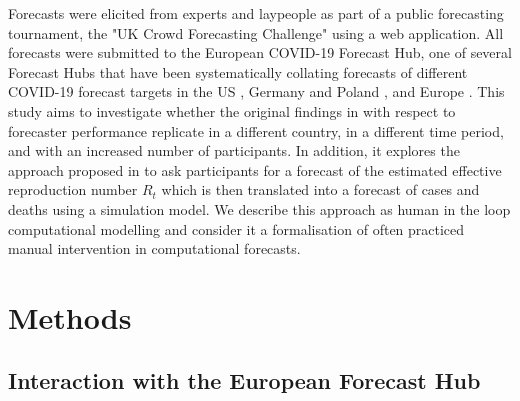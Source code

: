 \documentclass[10pt,a4paper,twocolumn]{article}
\begin{document}
Forecasts were elicited from experts and laypeople as part of a public forecasting tournament, the "UK Crowd Forecasting Challenge" using a web application. All forecasts were submitted to the European COVID-19 Forecast Hub, one of several Forecast Hubs that have been systematically collating forecasts of different COVID-19 forecast targets in the US \citep{cramerEvaluationIndividualEnsemble2021}, Germany and Poland \citep{bracherShorttermForecastingCOVID192021, bracherNationalSubnationalShortterm2022}, and Europe \citep{sherrattPredictivePerformanceMultimodel2022}. This study aims to investigate whether the original findings in \citet{bosseComparingHumanModelbased2022} with respect to forecaster performance replicate in a different country, in a different time period, and with an increased number of participants. In addition, it explores the approach proposed in \citet{bosseComparingHumanModelbased2022} to ask participants for a forecast of the estimated effective reproduction number $R_t$ which is then translated into a forecast of cases and deaths using a simulation model. We describe this approach as human in the loop computational modelling and consider it a formalisation of often practiced manual intervention in computational forecasts.

\section*{Methods}

\subsection*{Interaction with the European Forecast Hub}
\end{document}
